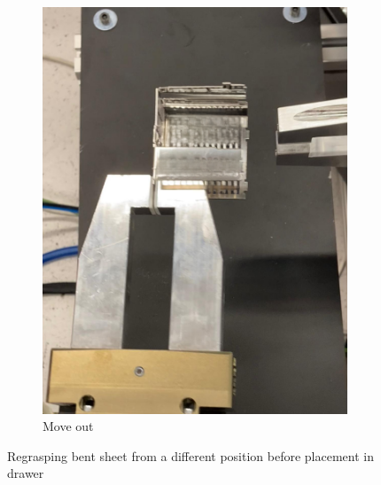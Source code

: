 \begin{figure}[h]
\begin{subfigure}[b]{0.32\textwidth}
        \includegraphics[width=\textwidth]{figures/sheet-pickup/sheet-placement06.png}
        \caption{Move out}
        \label{subfig:sheet-placement06}
        \vspace{0.45cm}
    \end{subfigure}\hspace{0.1cm}
    \caption{Regrasping bent sheet from a different position before placement in drawer}
    \label{fig:sheet-pickup-before-placement}
\end{figure}
